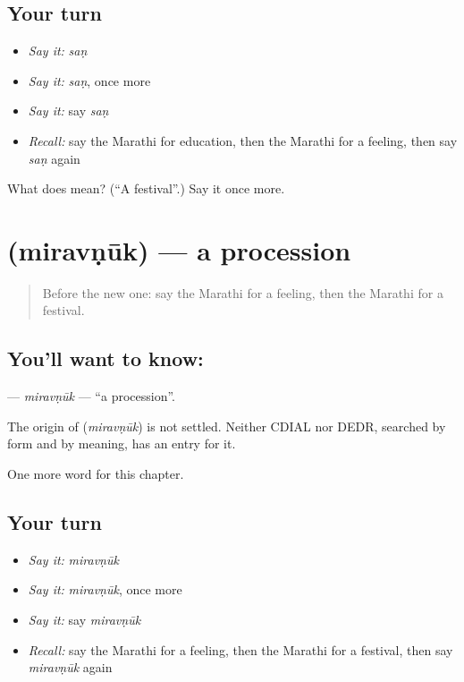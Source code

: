 \subsection*{Your turn}
\begin{itemize}
\raggedright
  \item \emph{Say it:} \emph{saṇ}
  \item \emph{Say it:} \emph{saṇ}, once more
  \item \emph{Say it:} say \emph{saṇ}
  \item \emph{Recall:} say the Marathi for education, then the Marathi for a feeling, then say \emph{saṇ} again
\end{itemize}

\begin{tcolorbox}[breakable,colback=teal!4,colframe=teal!35!black,title={Before you move on}]
What does  mean? (\textquotedblleft{}A festival\textquotedblright{}.) Say it once more.
\end{tcolorbox}
\section[\texorpdfstring{\mr{मिरवणूक} (miravṇūk)}{मिरवणूक (miravṇūk)}]{ (miravṇūk) — a procession}

\label{lesson:MR-C248-miravnuk}



\begin{quote}
Before the new one: say the Marathi for a feeling, then the Marathi for a festival.
\end{quote}

\subsection*{You'll want to know: }
\textbf{} — \emph{miravṇūk} — \textquotedblleft{}a procession\textquotedblright{}.

\begin{cousinweb}
The origin of \textbf{} (\emph{miravṇūk}) is not settled. Neither CDIAL nor DEDR, searched by form and by meaning, has an entry for it.
\end{cousinweb}

\begin{grammarlens}[title={What you've built}]
One more word for this chapter.
\end{grammarlens}

\subsection*{Your turn}
\begin{itemize}
\raggedright
  \item \emph{Say it:} \emph{miravṇūk}
  \item \emph{Say it:} \emph{miravṇūk}, once more
  \item \emph{Say it:} say \emph{miravṇūk}
  \item \emph{Recall:} say the Marathi for a feeling, then the Marathi for a festival, then say \emph{miravṇūk} again
\end{itemize}

